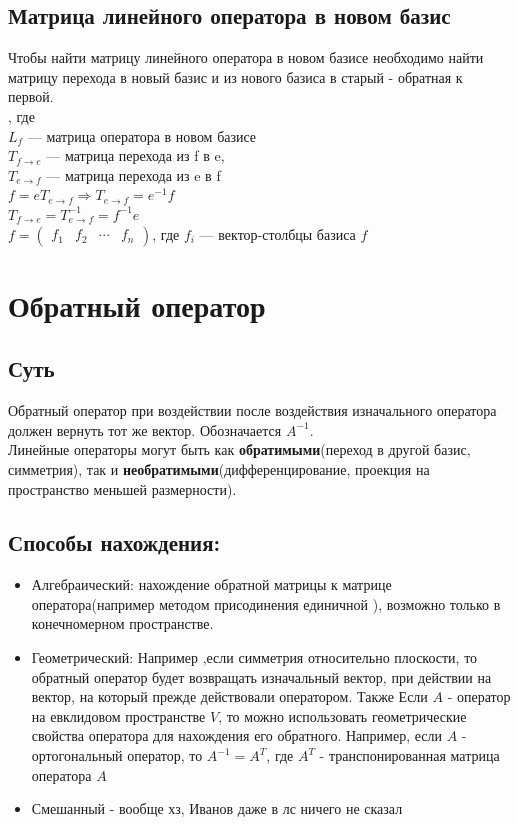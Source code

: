 \documentclass[12pt]{article}
\begin{document}
\subsection{Матрица линейного оператора в новом базис}
Чтобы найти матрицу линейного оператора в новом базисе необходимо найти матрицу перехода в новый базис и из нового базиса в старый - обратная к первой.\\
, где \\
$L_f$ --- матрица оператора в новом базисе\\ $T_{f\rightarrow e}$ --- матрица перехода из f в e, \\
$T_{e\rightarrow f}$ --- матрица перехода из e в f \\
$f = eT_{e \rightarrow f} \Rightarrow T_{e \rightarrow f} = e^{-1}f$ \\
$T_{f \rightarrow e} = T_{e \rightarrow f}^{-1} = f^{-1}e$ \\
$f = \begin{pmatrix}f_1 & f_2 & \cdots & f_n \end{pmatrix}$, где $f_i$ --- вектор-столбцы базиса $f$

\section{Обратный оператор}
\subsection{Суть}
Обратный оператор при воздействии после воздействия изначального оператора должен вернуть тот же вектор. Обозначается $A^{-1}$.\\ Линейные операторы могут быть как \textbf{обратимыми}(переход в другой базис, симметрия), так и \textbf{необратимыми}(дифференцирование, проекция на пространство меньшей размерности).
\subsection{Способы нахождения:}
\begin{itemize}
    \item Алгебраический: нахождение обратной матрицы к матрице оператора(например методом присодинения единичной ), возможно только в конечномерном пространстве.
    \item Геометрический: Например ,если симметрия относительно плоскости, то обратный оператор будет возвращать изначальный вектор, при действии на вектор, на который прежде действовали оператором. Также Если $A$ - оператор на евклидовом пространстве $V$, то можно использовать геометрические свойства оператора для нахождения его обратного. Например, если $A$ - ортогональный оператор, то $A^{-1} = A^T$, где $A^T$ - транспонированная матрица оператора $A$
    \item Смешанный - вообще хз, Иванов даже в лс ничего не сказал
\end{itemize}
\end{document}
